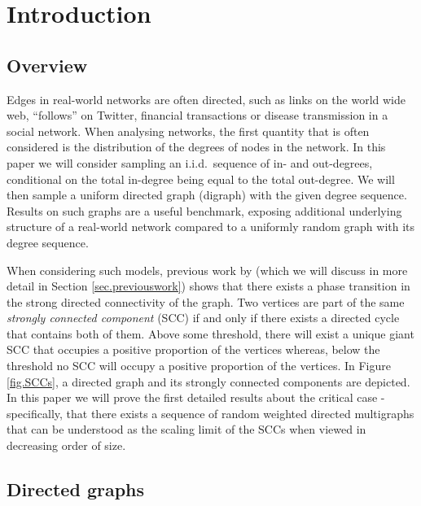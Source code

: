 \section{Introduction}


\subsection{Overview}

Edges in real-world networks are often directed, such as links on the world wide web, ``follows'' on Twitter, financial transactions or disease transmission in a social network. When analysing networks, the first quantity that is often considered is the distribution of the degrees of nodes in the network.  In this paper we will consider sampling an i.i.d.\ sequence of in- and out-degrees, conditional on the total in-degree being equal to the total out-degree. We will then sample a uniform directed graph (digraph) with the given degree sequence. Results on such graphs are a useful benchmark, exposing additional underlying structure of a real-world network compared to a uniformly random graph with its degree sequence.

When considering such models, previous work by \citet{cooperSizeLargestStrongly2004} (which we will discuss in more detail in Section \ref{sec.previouswork}) shows that there exists a phase transition in the strong directed connectivity of the graph. Two vertices are part of the same \emph{strongly connected component} (SCC) if and only if there exists a directed cycle that contains both of them. Above some threshold, there will exist a unique giant SCC that occupies a positive proportion of the vertices whereas, below the threshold no SCC will occupy a positive proportion of the vertices. In Figure \ref{fig.SCCs}, a directed graph and its strongly connected components are depicted. In this paper we will prove the first detailed results about the critical case - specifically, that there exists a sequence of random weighted directed multigraphs that can be understood as the scaling limit of the SCCs when viewed in decreasing order of size.

\subsection{Directed graphs}

